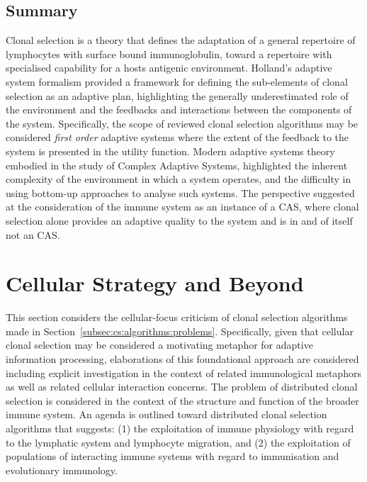 %
%
\subsection{Summary}
Clonal selection is a theory that defines the adaptation of a general repertoire of lymphocytes with surface bound immunoglobulin, toward a repertoire with specialised capability for a hosts antigenic environment.
Holland's adaptive system formalism provided a framework for defining the sub-elements of clonal selection as an adaptive plan, highlighting the generally underestimated role of the environment and the feedbacks and interactions between the components of the system. Specifically, the scope of reviewed clonal selection algorithms may be considered \emph{first order} adaptive systems where the extent of the feedback to the system is presented in the utility function. 
Modern adaptive systems theory embodied in the study of Complex Adaptive Systems, highlighted the inherent complexity of the environment in which a system operates, and the difficulty in using bottom-up approaches to analyse such systems. The perspective suggested at the consideration of the immune system as an instance of a CAS, where clonal selection alone provides an adaptive quality to the system and is in and of itself not an CAS.


%
%
\section{Cellular Strategy and Beyond}
\label{sec:cs:beyond}
This section considers the cellular-focus criticism of clonal selection algorithms made in Section~\ref{subsec:cs:algorithms:problems}. 
Specifically, given that cellular clonal selection may be considered a motivating metaphor for adaptive information processing, elaborations of this foundational approach are considered including explicit investigation in the context of related immunological metaphors as well as related cellular interaction concerns.
The problem of distributed clonal selection is considered in the context of the structure and function of the broader immune system. An agenda is outlined toward distributed clonal selection algorithms that suggests: (1) the exploitation of immune physiology with regard to the lymphatic system and lymphocyte migration, and (2) the exploitation of populations of interacting immune systems with regard to immunisation and evolutionary immunology.

